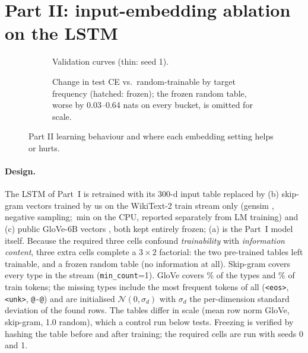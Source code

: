 \documentclass[10pt,a4paper]{article}
\begin{document}
\section{Part II: input-embedding ablation on the LSTM}
\begin{table}[t]\centering\footnotesize
{}
\caption{Part II: the LSTM of Part I with six input-embedding settings plus a row-norm control (rows 1, 4, 6 required; test PPL $\pm$ half-range over seeds 0/1 where run, other columns seed 0; cov.: types with a pre-trained vector; $\|g\|$: mean pre-clip gradient norm; row norm: after training).}
\label{tab:p2}
\end{table}
\begin{figure}[t]\centering
\begin{subfigure}[t]{0.49\linewidth}\centering{}\caption{Validation curves (thin: seed 1).}\end{subfigure}\hfill
\begin{subfigure}[t]{0.49\linewidth}\centering{}\caption{Change in test CE vs.\ random-trainable by target frequency (hatched: frozen); the frozen random table, worse by 0.03--0.64 nats on every bucket, is omitted for scale.}\end{subfigure}
\caption{Part II learning behaviour and where each embedding setting helps or hurts.}
\label{fig:p2}
\end{figure}
\paragraph{Design.}
The LSTM of Part~I is retrained with its $300$-d input table replaced by (b) skip-gram vectors \citep{mikolov2013distributed} trained
by us on the WikiText-2 train stream only (gensim \citep{rehurek2010gensim}, negative sampling; \skipgramMinutes{}\,min on the CPU,
reported separately from LM training) and (c) public GloVe-6B vectors \citep{pennington2014glove}, both
kept entirely frozen; (a) is the Part~I model itself. Because the required three cells confound \emph{trainability} with \emph{information content}, three extra cells complete a $3\times2$ factorial: the two pre-trained tables left trainable, and a frozen random table (no information at all). Skip-gram covers every type in the stream (\texttt{min\_count}=1). GloVe covers \gloveCoverageTypes\% of the types and \gloveCoverageTokens\% of train tokens; the \gloveMissing{} missing types include the most frequent tokens of all (\texttt{<eos>}, \texttt{<unk>}, \texttt{@-@}) and are initialised $\mathcal{N}(0,\sigma_d)$ with $\sigma_d$ the per-dimension standard deviation of the found rows. The tables differ in scale (mean row norm \rowNormGloveTable{} GloVe, \rowNormSkipgramTable{} skip-gram, 1.0 random), which a control run below tests. Freezing is verified by hashing the table before and after training; the required cells are run with seeds 0 and 1.
\end{document}
